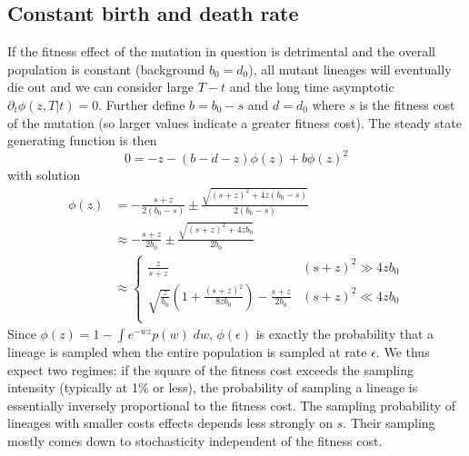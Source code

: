 \documentclass[9pt,twocolumn,twoside]{gsajnl_modified}
\begin{document}
\subsection*{Constant birth and death rate}
If the fitness effect of the mutation in question is detrimental and the overall population is constant (background $b_0=d_0$), all mutant lineages will eventually die out and we can consider large $T-t$ and the long time asymptotic $\partial_t \phi(z,T|t)=0$.
Further define $b=b_0 - s$ and $d=d_0$ where $s$ is the fitness cost of the mutation (so larger values indicate a greater fitness cost).
The steady state generating function is then
\begin{equation}
    0 = -z - (b-d-z) \phi(z) + b \phi(z)^2
\end{equation}
with solution
\begin{equation}
    \begin{split}
        \phi(z) & = -\frac{s + z}{2(b_0 - s)} \pm \frac{\sqrt{(s+z)^2 + 4z(b_0-s)}}{2(b_0-s)} \\
        &\approx -\frac{s + z}{2b_0} \pm \frac{\sqrt{(s+z)^2 + 4z b_0}}{2b_0} \\
        & \approx \begin{cases}
            \frac{z}{s+z} & (s+z)^2 \gg 4zb_0 \\
            \sqrt{\frac{z}{b_0}}\left(1+\frac{(s+z)^2}{8zb_0}\right)-\frac{s + z}{2b_0}  & (s+z)^2 \ll 4zb_0 \\
        \end{cases}
    \end{split}
\end{equation}
Since $\phi(z) = 1 - \int e^{-wz}p(w) \; dw$, $\phi(\epsilon)$ is exactly the probability that a lineage is sampled when the entire population is sampled at rate $\epsilon$.
We thus expect two regimes: if the square of the fitness cost exceeds the sampling intensity (typically at 1\% or less), the probability of sampling a lineage is essentially inversely proportional to the fitness cost.
The sampling probability of lineages with smaller costs effects depends less strongly on $s$.
Their sampling mostly comes down to stochasticity independent of the fitness cost.
\end{document}
